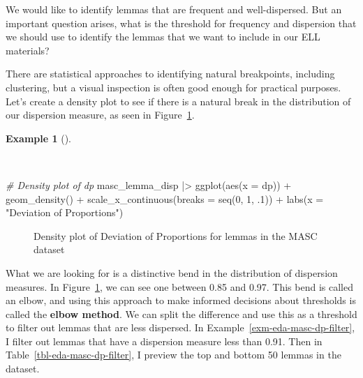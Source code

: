 \documentclass[
  letterpaper,
  DIV=11,
  numbers=noendperiod]{scrreprt}
\newenvironment{Shaded}{\begin{snugshade}}{\end{snugshade}}
\newcommand{\AttributeTok}[1]{\textcolor[rgb]{0.00,0.00,0.00}{#1}}
\newcommand{\CommentTok}[1]{\textcolor[rgb]{0.00,0.00,0.00}{\textit{#1}}}
\newcommand{\DecValTok}[1]{\textcolor[rgb]{0.00,0.00,0.00}{#1}}
\newcommand{\FunctionTok}[1]{\textcolor[rgb]{0.00,0.00,0.00}{#1}}
\newcommand{\NormalTok}[1]{\textcolor[rgb]{0.00,0.00,0.00}{#1}}
\newcommand{\SpecialCharTok}[1]{\textcolor[rgb]{0.00,0.00,0.00}{#1}}
\newcommand{\StringTok}[1]{\textcolor[rgb]{0.00,0.00,0.00}{#1}}
\theoremstyle{definition}
\newtheorem{example}{Example}[chapter]
\theoremstyle{remark}
\begin{document}
We would like to identify lemmas that are frequent and well-dispersed.
But an important question arises, what is the threshold for frequency
and dispersion that we should use to identify the lemmas that we want to
include in our ELL materials?

There are statistical approaches to identifying natural breakpoints,
including clustering, but a visual inspection is often good enough for
practical purposes. Let's create a density plot to see if there is a
natural break in the distribution of our dispersion measure, as seen in
Figure~\ref{fig-eda-masc-dp-density}.

\begin{example}[]\protect\hypertarget{exm-eda-masc-dp-density}{}\label{exm-eda-masc-dp-density}

~

\begin{Shaded}
\begin{Highlighting}[]
\CommentTok{\# Density plot of dp}
\NormalTok{masc\_lemma\_disp }\SpecialCharTok{|\textgreater{}}
  \FunctionTok{ggplot}\NormalTok{(}\FunctionTok{aes}\NormalTok{(}\AttributeTok{x =}\NormalTok{ dp)) }\SpecialCharTok{+}
  \FunctionTok{geom\_density}\NormalTok{() }\SpecialCharTok{+}
  \FunctionTok{scale\_x\_continuous}\NormalTok{(}\AttributeTok{breaks =} \FunctionTok{seq}\NormalTok{(}\DecValTok{0}\NormalTok{, }\DecValTok{1}\NormalTok{, .}\DecValTok{1}\NormalTok{)) }\SpecialCharTok{+}
  \FunctionTok{labs}\NormalTok{(}\AttributeTok{x =} \StringTok{"Deviation of Proportions"}\NormalTok{)}
\end{Highlighting}
\end{Shaded}

\begin{figure}[H]


\caption{\label{fig-eda-masc-dp-density}Density plot of Deviation of
Proportions for lemmas in the MASC dataset}

\end{figure}%

\end{example}

What we are looking for is a distinctive bend in the distribution of
dispersion measures. In Figure~\ref{fig-eda-masc-dp-density}, we can see
one between 0.85 and 0.97. This bend is called an elbow, and using this
approach to make informed decisions about thresholds is called the
\textbf{elbow method}. We can split the difference and use this as a
threshold to filter out lemmas that are less dispersed. In
Example~\ref{exm-eda-masc-dp-filter}, I filter out lemmas that have a
dispersion measure less than 0.91. Then in
Table~\ref{tbl-eda-masc-dp-filter}, I preview the top and bottom 50
lemmas in the dataset.
\end{document}
